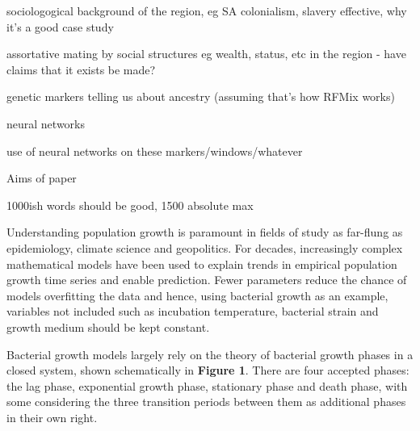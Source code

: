 \documentclass[11pt]{article}
\begin{document}
sociologogical background of the region, eg SA colonialism, slavery effective, why it's a good case study

assortative mating by social structures eg wealth, status, etc in the region - have claims that it exists be made?

genetic markers telling us about ancestry (assuming that's how RFMix works)

neural networks

use of neural networks on these markers/windows/whatever

Aims of paper






1000ish words should be good, 1500 absolute max





















Understanding population growth is paramount in fields of study as far-flung as epidemiology, climate science and geopolitics.\parencite{Ozgul2010,Peleg1997} For decades, increasingly complex mathematical models have been used to explain trends in empirical population growth time series and enable prediction.\parencite{Kingsland1982,Grijspeerdt1999,Tjørve2017} Fewer parameters reduce the chance of models overfitting the data and hence, using bacterial growth as an example, variables not included such as incubation temperature, bacterial strain and growth medium should be kept constant.

Bacterial growth models largely rely on the theory of bacterial growth phases in a closed system, shown schematically in \textbf{Figure 1}. There are four accepted phases: the lag phase, exponential growth phase, stationary phase and death phase, with some considering the three transition periods between them as additional phases in their own right.\parencite{Buchanan1918}
\end{document}
